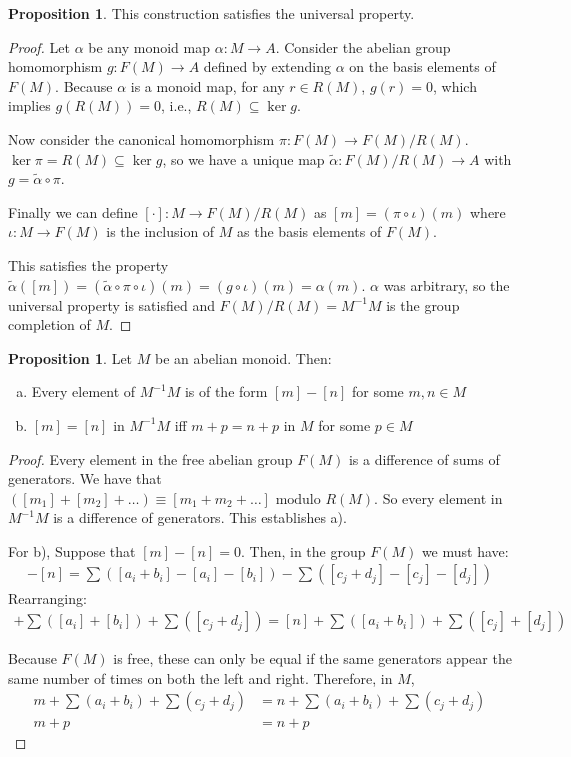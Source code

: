 \documentclass[10pt,a4paper]{article}
\theoremstyle{definition}
\newtheorem{prop}[theorem]{Proposition}
\begin{document}
\begin{prop}
This construction satisfies the universal property.
\end{prop}
\begin{proof}
Let $\alpha$ be any monoid map $\alpha : M \to A$. Consider the abelian group homomorphism $g : F(M) \to A$ defined by extending $\alpha$ on the basis elements of $F(M)$. Because $\alpha$ is a monoid map, for any $r\in R(M)$, $g(r) = 0$, which implies $g(R(M)) = 0$, i.e., $R(M) \subseteq \ker{g}$.

Now consider the canonical homomorphism $\pi : F(M) \to F(M) / R(M)$. $\ker \pi = R(M) \subseteq \ker{g}$, so we have a unique map $\tilde{\alpha} : F(M) / R(M) \to A$ with $g = \tilde{\alpha} \circ \pi$.

Finally we can define $[ \cdot ] : M \to F(M) / R(M)$ as $[m] = (\pi \circ \iota)(m)$ where $\iota : M \to F(M)$ is the inclusion of $M$ as the basis elements of $F(M)$.

This satisfies the property $\tilde{\alpha}([m]) = (\tilde{\alpha} \circ \pi \circ \iota)(m) = (g \circ \iota)(m) = \alpha(m)$. $\alpha$ was arbitrary, so the universal property is satisfied and $F(M) / R(M) = M^{-1} M$ is the group completion of $M$.
\end{proof}

\begin{prop}
Let $M$ be an abelian monoid. Then:
\begin{enumerate}[a)]
\item Every element of $M^{-1} M$ is of the form $[m] - [n]$ for some $m, n \in M$
\item $[m] = [n]$ in $M^{-1} M$ iff $m+p = n+p$ in $M$ for some $p \in M$
\end{enumerate}
\end{prop}
\begin{proof}
Every element in the free abelian group $F(M)$ is a difference of sums of generators. We have that $([m_1] + [m_2] + \dots) \equiv [m_1 + m_2 + \dots] \text{ modulo } R(M)$. So every element in $M^{-1} M$ is a difference of generators. This establishes a).

For b), Suppose that $[m] - [n] = 0$. Then, in the group $F(M)$ we must have:
\begin{align*}
[m] - [n] = \sum ([a_i + b_i] - [a_i] - [b_i]) - \sum ([c_j + d_j] - [c_j] - [d_j])
\end{align*}
Rearranging:
\begin{align*}
[m] + \sum ([a_i] + [b_i]) + \sum ([c_j + d_j]) = [n] + \sum ([a_i + b_i]) + \sum ([c_j] + [d_j])
\end{align*}

Because $F(M)$ is free, these can only be equal if the same generators appear the same number of times on both the left and right. Therefore, in $M$,
\begin{align*}
m + \sum (a_i + b_i) + \sum (c_j + d_j) &= n + \sum (a_i + b_i) + \sum (c_j + d_j) \\
m + p &= n + p
\end{align*}
\end{proof}
\end{document}
